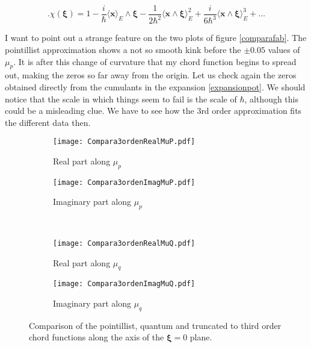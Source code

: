 \documentclass[a4paper,12pt]{article}
\newcommand{\ihb}{\frac{i}{\hbar}}
\newcommand{\xfase}{\mathbf{x}}
\newcommand{\xifase}{ {\boldsymbol{\xi}} }
\newcommand{\Prom}[2]{\langle #1\rangle_{#2}}
\begin{document}
\begin{equation} \label{expansionpot}.
\chi(\xifase)=1-\ihb \Prom{\xfase}{E}\wedge\xifase
-\frac{1}{2 \hbar^2}\Prom{\xfase\wedge\xifase}{E}^2
+\frac{i}{6 \hbar^3 }\Prom{\xfase\wedge\xifase}{E}^3+\ldots
\end{equation} 

I want to point out a strange feature on the two plots of figure \ref{comparafab}.
The pointillist approximation shows a not so smooth kink before the $\pm 0.05$ values
of $\mu_p$. It is after this change of curvature that my chord function
begins to spread out, making the zeros so far away from the origin. Let us check again
the zeros obtained directly from the cumulants in the expansion \ref{expansionpot}.
We should notice that the scale in which things seem to fail is the scale of $\hbar$,
although this could be a misleading clue. We have to see how the
3rd order approximation fits the different data then.


\begin{figure}[h]
  \centering     
  \begin{subfigure}[b]{0.45\textwidth}
    \centering
    \texttt{[image: Compara3ordenRealMuP.pdf]}
    \caption{Real part along $\mu_p$}
   \end{subfigure}%
  \begin{subfigure}[b]{0.45\textwidth}
    \centering
    \texttt{[image: Compara3ordenImagMuP.pdf]}
    \caption{Imaginary part along $\mu_p$}
  \end{subfigure}\\
   \begin{subfigure}[b]{0.45\textwidth}
    \centering
    \texttt{[image: Compara3ordenRealMuQ.pdf]}
    \caption{Real part along $\mu_q$}
    \label{real3ordenmuq}
   \end{subfigure}%
  \begin{subfigure}[b]{0.45\textwidth}
    \centering
    \texttt{[image: Compara3ordenImagMuQ.pdf]}
    \caption{Imaginary part along $\mu_q$}
    \label{imag3ordenmuq}
  \end{subfigure}
  \caption{Comparison of the pointillist, quantum and truncated to third order
chord functions along the axis of the $\xifase=0$ plane. }
  \label{compara3orden}
\end{figure}
\end{document}
